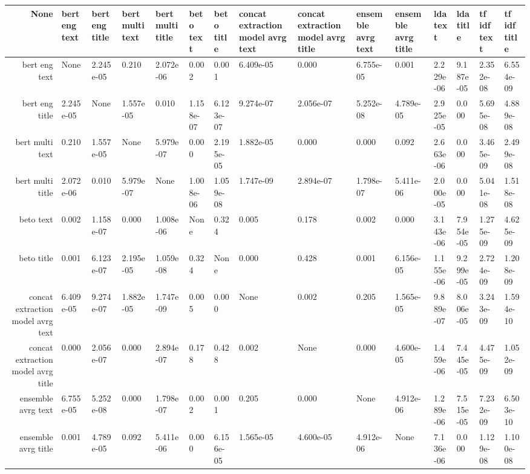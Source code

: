 \begin{tabular}{|r|l|l|l|l|l|l|l|l|l|l|l|l|l|l|}
  \hline
  None & bert eng text & bert eng title & bert multi text & bert multi title & beto text & beto title & concat extraction model avrg text & concat extraction model avrg title & ensemble avrg text & ensemble avrg title & lda text & lda title & tf idf text & tf idf title \\ 
  \hline
  bert eng text & None & 2.245e-05 & 0.210 & 2.072e-06 & 0.002 & 0.001 & 6.409e-05 & 0.000 & 6.755e-05 & 0.001 & 2.229e-06 & 9.187e-05 & 2.352e-08 & 6.554e-09 \\ 
  \hline
  bert eng title & 2.245e-05 & None & 1.557e-05 & 0.010 & 1.158e-07 & 6.123e-07 & 9.274e-07 & 2.056e-07 & 5.252e-08 & 4.789e-05 & 2.925e-05 & 0.000 & 5.695e-08 & 4.889e-08 \\ 
  \hline
  bert multi text & 0.210 & 1.557e-05 & None & 5.979e-07 & 0.000 & 2.195e-05 & 1.882e-05 & 0.000 & 0.000 & 0.092 & 2.663e-06 & 0.000 & 3.465e-09 & 2.499e-08 \\ 
  \hline
  bert multi title & 2.072e-06 & 0.010 & 5.979e-07 & None & 1.008e-06 & 1.059e-08 & 1.747e-09 & 2.894e-07 & 1.798e-07 & 5.411e-06 & 2.000e-05 & 0.000 & 5.041e-08 & 1.518e-08 \\ 
  \hline
  beto text & 0.002 & 1.158e-07 & 0.000 & 1.008e-06 & None & 0.324 & 0.005 & 0.178 & 0.002 & 0.000 & 3.143e-06 & 7.954e-05 & 1.275e-09 & 4.625e-09 \\ 
  \hline
  beto title & 0.001 & 6.123e-07 & 2.195e-05 & 1.059e-08 & 0.324 & None & 0.000 & 0.428 & 0.001 & 6.156e-05 & 1.155e-06 & 9.299e-05 & 2.724e-09 & 1.208e-09 \\ 
  \hline
  concat extraction model avrg text & 6.409e-05 & 9.274e-07 & 1.882e-05 & 1.747e-09 & 0.005 & 0.000 & None & 0.002 & 0.205 & 1.565e-05 & 9.889e-07 & 8.006e-05 & 3.243e-09 & 1.594e-10 \\ 
  \hline
  concat extraction model avrg title & 0.000 & 2.056e-07 & 0.000 & 2.894e-07 & 0.178 & 0.428 & 0.002 & None & 0.000 & 4.600e-05 & 1.459e-06 & 7.445e-05 & 4.475e-09 & 1.052e-09 \\ 
  \hline
  ensemble avrg text & 6.755e-05 & 5.252e-08 & 0.000 & 1.798e-07 & 0.002 & 0.001 & 0.205 & 0.000 & None & 4.912e-06 & 1.289e-06 & 7.515e-05 & 7.232e-09 & 6.503e-10 \\ 
  \hline
  ensemble avrg title & 0.001 & 4.789e-05 & 0.092 & 5.411e-06 & 0.000 & 6.156e-05 & 1.565e-05 & 4.600e-05 & 4.912e-06 & None & 7.136e-06 & 0.000 & 1.129e-08 & 1.100e-08 \\ 
  \hline

\end{tabular}
